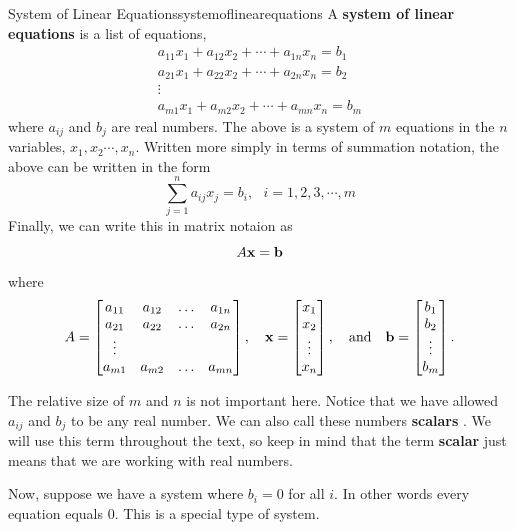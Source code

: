 \begin{definition}{System of Linear Equations}{systemoflinearequations}
A \textbf{system of linear equations}  is a list of equations,
\begin{equation*}
\begin{array}{c}
a_{11}x_{1}+a_{12}x_{2}+\cdots +a_{1n}x_{n}=b_{1} \\
a_{21}x_{1}+a_{22}x_{2}+\cdots +a_{2n}x_{n}=b_{2} \\
\vdots \\
a_{m1}x_{1}+a_{m2}x_{2}+\cdots +a_{mn}x_{n}=b_{m}
\end{array}
\end{equation*}
where $a_{ij}$ and $b_{j}$ are real numbers. The above is a system
of $m$ equations in the $n$ variables, $x_{1},x_{2}\cdots ,x_{n}$.
 Written more simply in terms
of summation notation, the above can be written in the form
\begin{equation*}
\sum_{j=1}^{n}a_{ij}x_{j}=b_{i},
\text{ }i=1,2,3,\cdots ,m
\end{equation*}
Finally, we can write this in matrix notaion as 
$$
A \mathbf{x} = \mathbf{b} 
$$
where 
$$
A = \begin{bmatrix}
a_{11} & a_{12} & \dots & a_{1n}\\
a_{21} & a_{22} & \dots & a_{2n}\\
\vdots\\
a_{m1} & a_{m2} & \dots & a_{mn}
\end{bmatrix}, \ \ \ \mathbf{x} = \begin{bmatrix} x_1 \\ x_2 \\ \vdots \\ x_n\end{bmatrix}, \ \ \mbox{ and } \ \ \mathbf{b} = \begin{bmatrix} b_1 \\ b_2 \\ \vdots \\ b_m\end{bmatrix}.
$$
\end{definition}

The relative size of $m$ and $n$ is not important here. Notice that we
have allowed $a_{ij}$ and $b_{j}$ to be any real number.  We can also
call these numbers \textbf{scalars} . We will use this
term throughout the text, so keep in mind that the term
\textbf{scalar} just means that we are working with real numbers.

Now, suppose we have a system where $b_{i} = 0$ for all $i$. In other words every
equation equals $0$. This is a special type of system.

